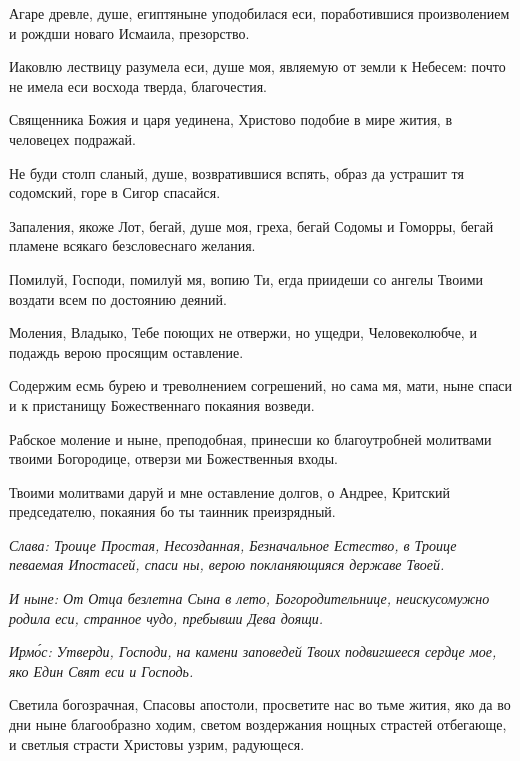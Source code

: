 Агаре древле, душе, египтяныне уподобилася еси, поработившися произволением и рождши новаго Исмаила, презорство.

Иаковлю лествицу разумела еси, душе моя, являемую от земли к Небесем: почто не имела еси восхода тверда, благочестия.

Священника Божия и царя уединена, Христово подобие в мире жития, в человецех подражай.

Не буди столп сланый, душе, возвратившися вспять, образ да устрашит тя содомский, горе в Сигор спасайся.

Запаления, якоже Лот, бегай, душе моя, греха, бегай Содомы и Гоморры, бегай пламене всякаго безсловеснаго желания.

Помилуй, Господи, помилуй мя, вопию Ти, егда приидеши со ангелы Твоими воздати всем по достоянию деяний.

Моления, Владыко, Тебе поющих не отвержи, но ущедри, Человеколюбче, и подаждь верою просящим оставление.


Содержим есмь бурею и треволнением согрешений, но сама мя, мати, ныне спаси и к пристанищу Божественнаго покаяния возведи.


Рабское моление и ныне, преподобная, принесши ко благоутробней молитвами твоими Богородице, отверзи ми Божественныя входы.


Твоими молитвами даруй и мне оставление долгов, о Андрее, Критский председателю, покаяния бо ты таинник преизрядный.

\itshape Слава\normalfont{}: Троице Простая, Несозданная, Безначальное Естество, в Троице певаемая Ипостасей, спаси ны, верою покланяющияся державе Твоей.

\itshape И ныне\normalfont{}: От Отца безлетна Сына в лето, Богородительнице, неискусомужно родила еси, странное чудо, пребывши Дева доящи.

\itshape Ирм\'{о}с\normalfont{}: Утверди, Господи, на камени заповедей Твоих подвигшееся сердце мое, яко Един Свят еси и Господь. 


Светила богозрачная, Спасовы апостоли, просветите нас во тьме жития, яко да во дни ныне благообразно ходим, светом воздержания нощных страстей отбегающе, и светлыя страсти Христовы узрим, радующеся. 

